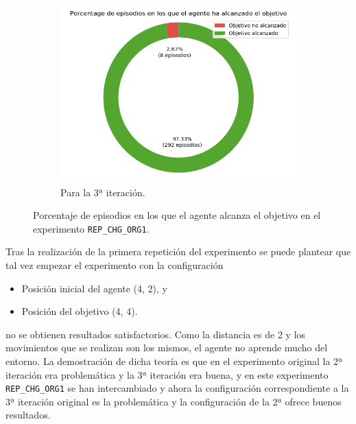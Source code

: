\begin{figure}
\begin{subfigure}{.5\textwidth}
    \end{subfigure}
    \begin{subfigure}{.5\textwidth}
        \centering
        \includegraphics[scale=0.3]{cap5_experimentacion/images/CHANGE_ORIGIN-20_09-00_50-0, 2, 1_it3_porcentajeResuelto.png}
        \caption{Para la 3ª iteración.}
        \label{fig:CHANGE_ORIGIN-20_09-00_50-0, 2, 1_it3_porcentajeResuelto}
    \end{subfigure}%
    \caption{Porcentaje de episodios en los que el agente alcanza el objetivo en el experimento \texttt{REP\_CHG\_ORG1}.}
    \label{fig:CHANGE_ORIGIN-20_09-00_50-0, 2, 1_porcentajeResuelto}
\end{figure}

Tras la realización de la primera repetición del experimento  se puede plantear que tal vez empezar el experimento con la configuración
\begin{itemize}
    \item Posición inicial del agente (4, 2), y
    \item Posición del objetivo (4, 4).
\end{itemize}

no se obtienen resultados satisfactorios. Como la distancia es de 2 y los movimientos que se realizan son los mismos, el agente no aprende mucho del entorno. La demostración de dicha teoría es que en el experimento original la 2ª iteración era problemática y la 3ª iteración era buena, y en este experimento \texttt{REP\_CHG\_ORG1} se han intercambiado y ahora la configuración correspondiente a la 3ª iteración original es la problemática y la configuración de la 2ª ofrece buenos resultados. 


